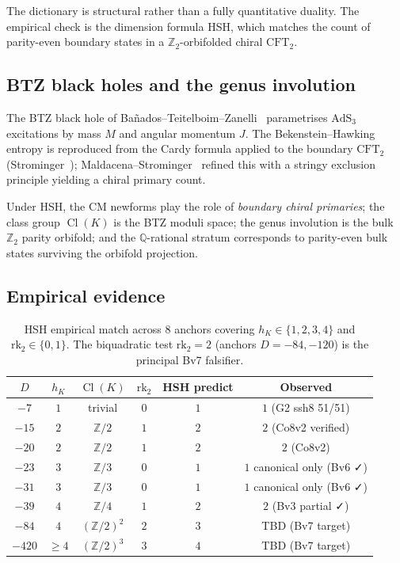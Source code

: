 \documentclass[11pt,a4paper]{amsart}
\theoremstyle{definition}
\DeclareMathOperator{\Cl}{Cl}
\newcommand{\Q}{\mathbb{Q}}
\newcommand{\Z}{\mathbb{Z}}
\newcommand{\hK}{h_{K}}
\newcommand{\rktwo}{\mathrm{rk}_2}
\begin{document}
The dictionary is structural rather than a fully quantitative duality. The empirical check is the dimension formula HSH, which matches the count of parity-even boundary states in a $\Z_2$-orbifolded chiral $\mathrm{CFT}_2$.

\subsection{BTZ black holes and the genus involution}\label{sec:HSH-BTZ}

The BTZ black hole of Ba\~nados--Teitelboim--Zanelli~\cite{BTZ1992} parametrises $\mathrm{AdS}_3$ excitations by mass $M$ and angular momentum $J$. The Bekenstein--Hawking entropy is reproduced from the Cardy formula applied to the boundary $\mathrm{CFT}_2$ (Strominger~\cite{Strominger1998}); Maldacena--Strominger~\cite{MaldacenaStrominger1998} refined this with a stringy exclusion principle yielding a chiral primary count.

Under HSH, the CM newforms play the role of \emph{boundary chiral primaries}; the class group $\Cl(K)$ is the BTZ moduli space; the genus involution is the bulk $\Z_2$ parity orbifold; and the $\Q$-rational stratum corresponds to parity-even bulk states surviving the orbifold projection.

\subsection{Empirical evidence}\label{sec:HSH-evidence}

\begin{table}[h]
\centering
\caption{HSH empirical match across 8 anchors covering $\hK \in \{1, 2, 3, 4\}$ and $\rktwo \in \{0, 1\}$. The biquadratic test $\rktwo = 2$ (anchors $D = -84, -120$) is the principal Bv7 falsifier.}
\label{tab:HSH-evidence}
\begin{tabular}{cccccc}
\toprule
$D$ & $\hK$ & $\Cl(K)$ & $\rktwo$ & HSH predict & Observed \\
\midrule
$-7$ & $1$ & trivial & $0$ & $1$ & $1$ (G2 ssh8 51/51) \\
$-15$ & $2$ & $\Z/2$ & $1$ & $2$ & $2$ (Co8v2 verified) \\
$-20$ & $2$ & $\Z/2$ & $1$ & $2$ & $2$ (Co8v2) \\
$-23$ & $3$ & $\Z/3$ & $0$ & $1$ & $1$ canonical only (Bv6 ✓) \\
$-31$ & $3$ & $\Z/3$ & $0$ & $1$ & $1$ canonical only (Bv6 ✓) \\
$-39$ & $4$ & $\Z/4$ & $1$ & $2$ & $2$ (Bv3 partial ✓) \\
$-84$ & $4$ & $(\Z/2)^2$ & $2$ & $3$ & TBD (Bv7 target) \\
$-420$ & $\ge 4$ & $(\Z/2)^3$ & $3$ & $4$ & TBD (Bv7 target) \\
\bottomrule
\end{tabular}
\end{table}
\end{document}
